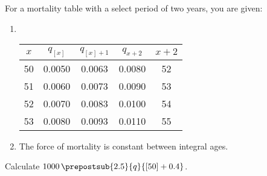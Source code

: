 For a mortality table with a select period of two years, you are given:
\begin{enumerate}
\item \ \\ \begin{center}\begin{tabular}{ccccc} $x$ & $q_{[x]}$ & $q_{[x]+1}$ & $q_{x+2}$ & $x+2$ \\ \hline
                                                                                   50 & 0.0050   & 0.0063       & 0.0080     & 52  \\ 
                                                                                    51 & 0.0060   & 0.0073       & 0.0090     & 53  \\ 
                                                                                   52 & 0.0070   & 0.0083       & 0.0100     & 54  \\ 
                                                                                   53 & 0.0080   & 0.0093       & 0.0110     & 55  
            \end{tabular}\end{center}
\item The force of mortality is constant between integral ages.
\end{enumerate}
Calculate $1000 \, \prepostsub{2.5}{q}{[50]+0.4}$.
